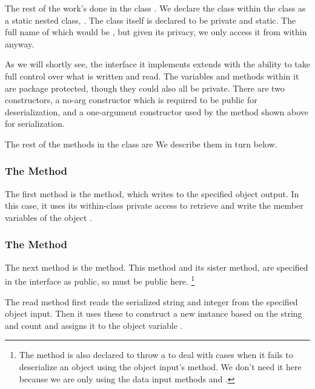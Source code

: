 The rest of the work's done in the class .  We
declare the class within the  class as a static
nested class, .  
%
%
The class itself is declared to be private and static.  The full name
of which would be
, but given its
privacy, we only access it from within  anyway.

As we will shortly see, the  interface it
implements extends  with the ability to take full
control over what is written and read.  The variables and methods
within it are package protected, though they could also all be
private.  There are two constructors, a no-arg constructor which is
required to be public for deserialization, and a one-argument
constructor used by the  method shown above for
serialization.

The rest of the methods in the  class are
%
%
We describe them in turn below.

\subsubsection{The  Method}

The first method is the  method, which writes to
the specified object output.  In this case, it uses its within-class
private access to retrieve and write the member variables of the
 object .  

\subsubsection{The  Method}

The next method is the  method.  This method
and its sister method,  are specified in
the  interface as public, so must be public here.%
%
\footnote{The  method is also declared to throw a
   to deal with cases when it fails to
  deserialize an object using the object input's 
  method.  We don't need it here because we are only using the data
  input methods  and .}

The read method first reads the serialized string and integer from the
specified object input.  Then it uses these to construct a new
 instance based on the string and count and
assigns it to the object variable .

